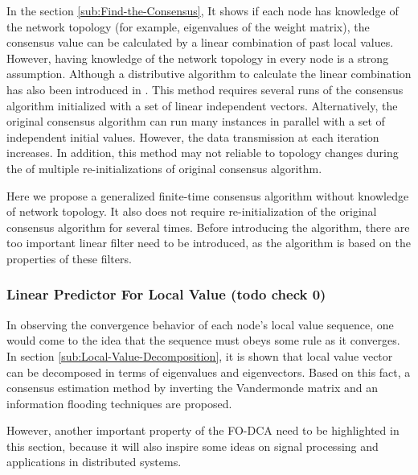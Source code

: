 In the section \ref{sub:Find-the-Consensus}, It shows if each node
has knowledge of the network topology (for example, eigenvalues of
the weight matrix), the consensus value can be calculated by a linear
combination of past local values. However, having knowledge of the
network topology in every node is a strong assumption. Although a
distributive algorithm to calculate the linear combination has also
been introduced in \cite{Sundaram2007}. This method requires several
runs of the consensus algorithm initialized with a set of linear independent
vectors. Alternatively, the original consensus algorithm can run many
instances in parallel with a set of independent initial values. However,
the data transmission at each iteration increases. In addition, this
method may not reliable to topology changes during the of multiple
re-initializations of original consensus algorithm. 

Here we propose a generalized finite-time consensus algorithm without
knowledge of network topology. It also does not require re-initialization
of the original consensus algorithm for several times. Before introducing
the algorithm, there are too important linear filter need to be introduced,
as the algorithm is based on the properties of these filters.


\subsubsection{Linear Predictor For Local Value (todo check 0)}

In observing the convergence behavior of each node's local value sequence,
one would come to the idea that the sequence must obeys some rule
as it converges. In section \ref{sub:Local-Value-Decomposition},
it is shown that local value vector can be decomposed in terms of
eigenvalues and eigenvectors. Based on this fact, a consensus estimation
method by inverting the Vandermonde matrix and an information flooding
techniques are proposed.

However, another important property of the FO-DCA need to be highlighted
in this section, because it will also inspire some ideas on signal
processing and applications in distributed systems.

